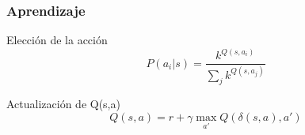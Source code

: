 \documentclass{beamer}
\begin{document}
\begin{frame}
\frametitle{Aprendizaje}

\begin{block}{Elecci\'on de la acci\'on}
\begin{equation}
 P(a_{i} | s) = \dfrac{k^{Q(s,a_{i})}}{\sum_{j}k^{Q(s,a_{j})}}
\end{equation}
\end{block} 

\begin{block}{Actualizaci\'on de Q(s,a)}
\begin{equation}
Q (s,a) = r + {\gamma\max_{a'}} Q(\delta(s ,a ) , a') 
\end{equation}
\end{block}

\end{frame}
\end{document}
